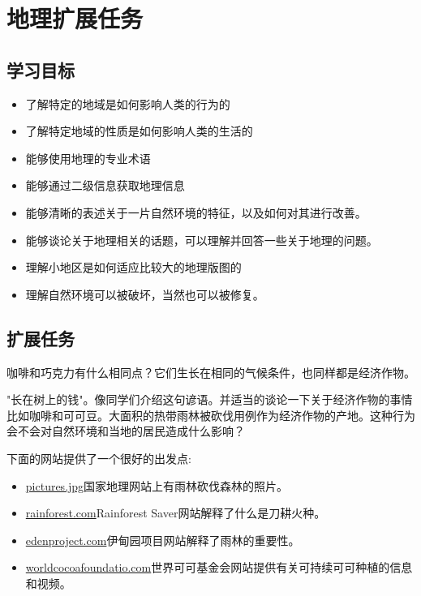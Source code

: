 \chapter{地理扩展任务}


\section{学习目标}
    \begin{itemize}
      \item 了解特定的地域是如何影响人类的行为的
      \item 了解特定地域的性质是如何影响人类的生活的
      \item 能够使用地理的专业术语
      \item 能够通过二级信息获取地理信息
      \item 能够清晰的表述关于一片自然环境的特征，以及如何对其进行改善。
      \item 能够谈论关于地理相关的话题，可以理解并回答一些关于地理的问题。
      \item 理解小地区是如何适应比较大的地理版图的
      \item 理解自然环境可以被破坏，当然也可以被修复。
    \end{itemize}  

    

\section{扩展任务}
     咖啡和巧克力有什么相同点？它们生长在相同的气候条件，也同样都是经济作物。\par
     "长在树上的钱"。像同学们介绍这句谚语。并适当的谈论一下关于经济作物的事情比如咖啡和可可豆。大面积的热带雨林被砍伐用例作为经济作物的产地。这种行为会不会对自然环境和当地的居民造成什么影响？\par
     下面的网站提供了一个很好的出发点:\par
     \begin{itemize}
       \item  \href{http://environment.nationalgeographic.com/environment/photos/rainforest-deforestation//%23/madagascar-slash-burn_278_600x450.jpg}{pictures.jpg}国家地理网站上有雨林砍伐森林的照片。
       \item  \href{http://www.rainforestsaver.org/what-slash-and-burn-farming}{rainforest.com}Rainforest Saver网站解释了什么是刀耕火种。
       \item  \href{http://www.edenproject.com/rainforest/}{edenproject.com}伊甸园项目网站解释了雨林的重要性。
       \item  \href{http://www.worldcocoafoundation.org}{worldcocoafoundatio.com}世界可可基金会网站提供有关可持续可可种植的信息和视频。
     \end{itemize}  
     
